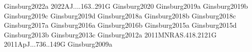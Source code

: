 \documentclass{article}
\begin{document}


























%



%

%
%
%
%
%
%
%
%
%
%
%
%
%
%
%
%
%
%
%








%

%




\nocite{biba}{Ginsburg2022a}
\nocite{biba}{2022AJ....163..291G}
\nocite{biba}{Ginsburg2020}
\nocite{biba}{Ginsburg2019a}
\nocite{biba}{Ginsburg2019b}
\nocite{biba}{Ginsburg2019c}
\nocite{biba}{Ginsburg2019d}
\nocite{biba}{Ginsburg2018a}
\nocite{biba}{Ginsburg2018b}
\nocite{biba}{Ginsburg2018c}
\nocite{biba}{Ginsburg2017a}
\nocite{biba}{Ginsburg2016a}
\nocite{biba}{Ginsburg2016b}
\nocite{biba}{Ginsburg2015a}
\nocite{biba}{Ginsburg2015d}
\nocite{biba}{Ginsburg2013b}
\nocite{biba}{Ginsburg2013c}
\nocite{biba}{Ginsburg2012a}
\nocite{biba}{2011MNRAS.418.2121G}
\nocite{biba}{2011ApJ...736..149G}
\nocite{biba}{Ginsburg2009a}
\end{document}
